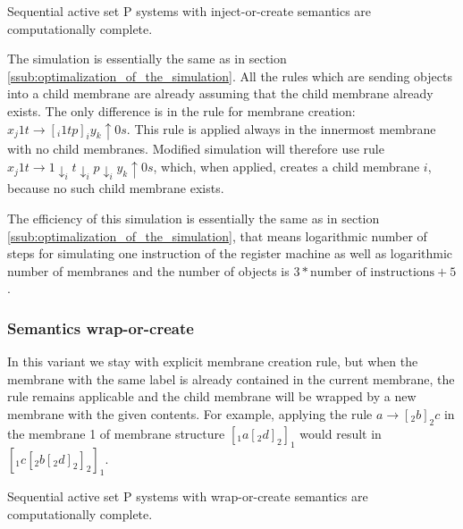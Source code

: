 
    \begin{veta}
      Sequential active set P systems with inject-or-create semantics are computationally complete.
    \end{veta}

    \begin{dokaz}
      The simulation is essentially the same as in section \ref{ssub:optimalization_of_the_simulation}. All the rules which are sending objects into a child membrane are already assuming that the child membrane already exists. The only difference is in the rule for membrane creation: $x_j1t \rightarrow [_i 1tp]_iy_k\uparrow 0s$. This rule is applied always in the innermost membrane with no child membranes. Modified simulation will therefore use rule $x_j1t \rightarrow 1\downarrow_i t\downarrow_i p\downarrow_i y_k\uparrow 0s$, which, when applied, creates a child membrane $i$, because no such child membrane exists.
    \end{dokaz}

    The efficiency of this simulation is essentially the same as in section \ref{ssub:optimalization_of_the_simulation}, that means logarithmic number of steps for simulating one instruction of the register machine as well as logarithmic number of membranes and the number of objects is $3 * \text{number of instructions} + 5$.


  \subsubsection{Semantics wrap-or-create} %
  \label{ssub:semantics_wrap_or_create}
    
    In this variant we stay with explicit membrane creation rule, but when the membrane with the same label is already contained in the current membrane, the rule remains applicable and the child membrane will be wrapped by a new membrane with the given contents. For example, applying the rule $a \rightarrow [_2 b ]_2 c$ in the membrane 1 of membrane structure $[_1 a [_2 d ]_2 ]_1$ would result in $[_1 c [_2 b [_2 d ]_2 ]_2 ]_1$.


    \begin{veta}
      Sequential active set P systems with wrap-or-create semantics are computationally complete.
    \end{veta}

